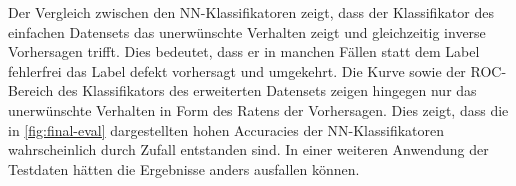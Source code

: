 Der Vergleich zwischen den NN-Klassifikatoren zeigt, dass der Klassifikator des einfachen Datensets das unerwünschte Verhalten zeigt und gleichzeitig inverse Vorhersagen trifft. Dies bedeutet, dass er in manchen Fällen statt dem Label \glqq fehlerfrei\grqq{} das Label \glqq defekt\grqq{} vorhersagt und umgekehrt. Die Kurve sowie der ROC-Bereich des Klassifikators des erweiterten Datensets zeigen hingegen nur das unerwünschte Verhalten in Form des \glqq Ratens\grqq{} der Vorhersagen. Dies zeigt, dass die in \autoref{fig:final-eval} dargestellten hohen Accuracies der NN-Klassifikatoren wahrscheinlich durch Zufall entstanden sind. In einer weiteren Anwendung der Testdaten hätten die Ergebnisse anders ausfallen können.

\begin{figure}[h!t]
  \centering
  \qquad

\end{figure}
